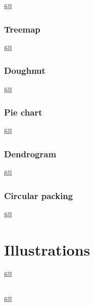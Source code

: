\documentclass[
  b5paper]{book}
\begin{document}
fill

\hypertarget{treemap}{%
\subsubsection*{Treemap}\label{treemap}}

fill

\hypertarget{doughnut}{%
\subsubsection*{Doughnut}\label{doughnut}}

fill

\hypertarget{pie-chart}{%
\subsubsection*{Pie chart}\label{pie-chart}}

fill

\hypertarget{dendrogram}{%
\subsubsection*{Dendrogram}\label{dendrogram}}

fill

\hypertarget{circular-packing}{%
\subsubsection*{Circular packing}\label{circular-packing}}

fill

\hypertarget{illustrations}{%
\section{Illustrations}\label{illustrations}}

fill

\hypertarget{section-1}{%
\subsection*{}\label{section-1}}

fill

\hypertarget{section-2}{%
\subsection*{}\label{section-2}}
\end{document}
